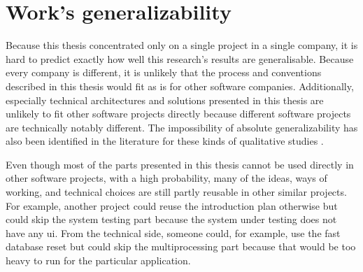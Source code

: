 \section{Work's generalizability}
Because this thesis concentrated only on a single project in a single company, it is hard to predict exactly how well this research's results are generalisable. Because every company is different, it is unlikely that the process and conventions described in this thesis would fit as is for other software companies. Additionally, especially technical architectures and solutions presented in this thesis are unlikely to fit other software projects directly because different software projects are technically notably different. The impossibility of absolute generalizability has also been identified in the literature for these kinds of qualitative studies \cite{marshall1996sampling}.

Even though most of the parts presented in this thesis cannot be used directly in other software projects, with a high probability, many of the ideas, ways of working, and technical choices are still partly reusable in other similar projects. For example, another project could reuse the introduction plan otherwise but could skip the system testing part because the system under testing does not have any \gls{ui}. From the technical side, someone could, for example, use the fast database reset but could skip the multiprocessing part because that would be too heavy to run for the particular application.